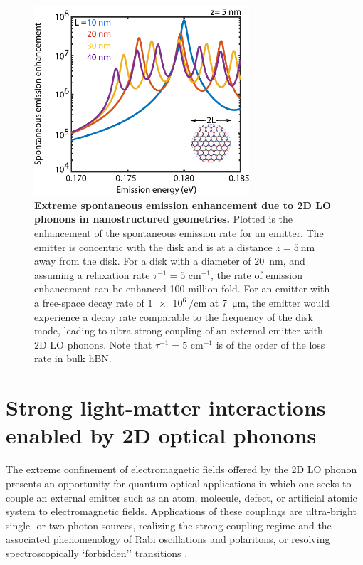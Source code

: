 \documentclass[aps,prb,twocolumn,
	           groupedaddress,superscriptaddress,
               amsfonts,amssymb,amsmath,floatfix,
	           citeautoscript]{revtex4-1}
\begin{document}
\begin{figure}[t]
    \includegraphics[width=80mm]{fig3.pdf}
    \caption{%
        \textbf{Extreme spontaneous emission enhancement due to 2D LO phonons in nanostructured geometries.} Plotted is the enhancement of the spontaneous emission rate for an emitter. The emitter is concentric with the disk and is at a distance $z=\SI{5}{\nm}$ away from the disk. For a disk with a diameter of \SI{20}{\nm}, and assuming a relaxation rate $\tau^{-1} = 5$ cm$^{-1}$, the rate of emission enhancement can be enhanced \num{100} million-fold. For an emitter with a free-space decay rate of $\SI{1e6}{\per\cm}$ at \SI{7}{\micro\m}, the emitter would experience a decay rate comparable to the frequency of the disk mode, leading to ultra-strong coupling of an external emitter with 2D LO phonons. Note that $\tau^{-1} = 5$ cm$^{-1}$ is of the order of the loss rate in bulk hBN.
        \label{fig:3}
        }
\end{figure}

\section{Strong light-matter interactions enabled by 2D optical phonons}

The extreme confinement of electromagnetic fields offered by the 2D LO phonon presents an opportunity for quantum optical applications in which one seeks to couple an external emitter such as an atom, molecule, defect, or artificial atomic system to electromagnetic fields. Applications of these couplings are ultra-bright single- or two-photon sources, realizing the strong-coupling regime and the associated phenomenology of Rabi oscillations and polaritons, or resolving spectroscopically `forbidden'' transitions \cite{koppens2011graphene,autore2018boron,rivera2016shrinking,rivera2017making,kurman2018control}.
\end{document}
